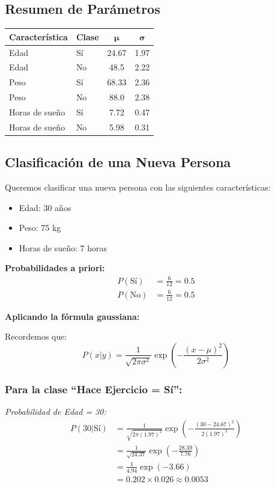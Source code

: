 \documentclass[12pt]{article}
\begin{document}
\subsection{Resumen de Parámetros}
\begin{table}[H]
    \centering
    \begin{tabular}{llcc}
        \toprule
        \textbf{Característica} & \textbf{Clase} & $\boldsymbol{\mu}$ & $\boldsymbol{\sigma}$ \\
        \midrule
        Edad & Sí & 24.67 & 1.97 \\
        Edad & No & 48.5 & 2.22 \\
        \midrule
        Peso & Sí & 68.33 & 2.36 \\
        Peso & No & 88.0 & 2.38 \\
        \midrule
        Horas de sueño & Sí & 7.72 & 0.47 \\
        Horas de sueño & No & 5.98 & 0.31 \\
        \bottomrule
    \end{tabular}
\end{table}

\subsection{Clasificación de una Nueva Persona}
Queremos clasificar una nueva persona con las siguientes características:
\begin{itemize}
    \item Edad: 30 años
    \item Peso: 75 kg
    \item Horas de sueño: 7 horas
\end{itemize}

\textbf{Probabilidades a priori:}
\begin{align*}
P(\text{Sí}) &= \frac{6}{12} = 0.5 \\
P(\text{No}) &= \frac{6}{12} = 0.5
\end{align*}

\textbf{Aplicando la fórmula gaussiana:}

Recordemos que:
\[
P(x|y) = \frac{1}{\sqrt{2\pi\sigma^2}} \exp\left(-\frac{(x-\mu)^2}{2\sigma^2}\right)
\]

\subsubsection{Para la clase ``Hace Ejercicio = Sí'':}

\textit{Probabilidad de Edad = 30:}
\begin{align*}
P(30|\text{Sí}) &= \frac{1}{\sqrt{2\pi(1.97)^2}} \exp\left(-\frac{(30-24.67)^2}{2(1.97)^2}\right) \\
&= \frac{1}{\sqrt{24.37}} \exp\left(-\frac{28.39}{7.76}\right) \\
&= \frac{1}{4.94} \exp(-3.66) \\
&= 0.202 \times 0.026 \approx 0.0053
\end{align*}
\end{document}
